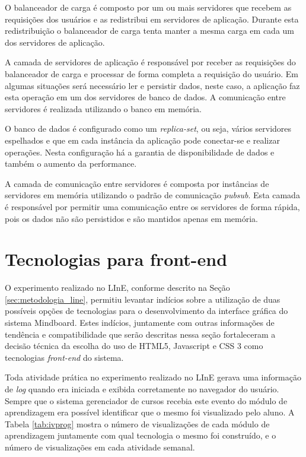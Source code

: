 O balanceador de carga é composto por um ou mais servidores que recebem as requisições dos usuários e as redistribui em servidores de aplicação. Durante esta redistribuição o balanceador de carga tenta manter a mesma carga em cada um dos servidores de aplicação.

A camada de servidores de aplicação é responsável por receber as requisições do balanceador de carga e processar de forma completa a requisição do usuário. Em algumas situações será necessário ler e persistir dados, neste caso, a aplicação faz esta operação em um dos servidores de banco de dados. A comunicação entre servidores é realizada utilizando o banco em memória.

O banco de dados é configurado como um \emph{replica-set}, ou seja, vários servidores espelhados e que em cada instância da aplicação pode conectar-se e realizar operações. Nesta configuração há a garantia de disponibilidade de dados e também o aumento da performance.

A camada de comunicação entre servidores é composta por instâncias de servidores em memória utilizando o padrão de comunicação \emph{pubsub}. Esta camada é responsável por permitir uma comunicação entre os servidores de forma rápida, pois os dados não são persistidos e são mantidos apenas em memória.


\section{Tecnologias para front-end}
\label{sec:tecnologias_frontend}

O experimento realizado no LInE, conforme descrito na Seção \ref{sec:metodologia_line}, permitiu levantar indícios sobre a utilização de duas possíveis opções de tecnologias para o desenvolvimento da interface gráfica do sistema Mindboard. Estes indícios, juntamente com outras informações de tendência e compatibilidade que serão descritas nessa seção fortaleceram a decisão técnica da escolha do uso de HTML5, Javascript e CSS 3 como tecnologias \emph{front-end} do sistema.

Toda atividade prática no experimento realizado no LInE gerava uma informação de \emph{log} quando era iniciada e exibida corretamente no navegador do usuário. Sempre que o sistema gerenciador de cursos recebia este evento do módulo de aprendizagem era possível identificar que o mesmo foi visualizado pelo aluno. A Tabela \ref{tab:ivprog} mostra o número de visualizações de cada módulo de aprendizagem juntamente com qual tecnologia o mesmo foi construído, e o número de visualizações em cada atividade semanal.

